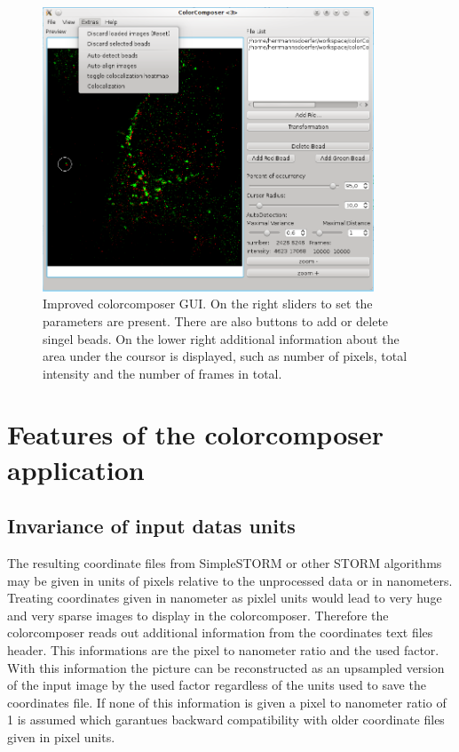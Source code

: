 \begin{figure}
\centering
\includegraphics[width = 0.88\textwidth]{pictures/GuiColorcomposer/BeforeAlignmentWithMenu.png}
\caption{Improved colorcomposer GUI. On the right sliders to set the parameters are present. There are also buttons to add or delete singel beads. On the lower right additional information about the area under the coursor is displayed, such as number of pixels, total intensity and the number of frames in total.}
\label{ColorComposer}
\end{figure}


\section{Features of the colorcomposer application}
\subsection{Invariance of input datas units}
The resulting coordinate files from SimpleSTORM or other STORM algorithms may be given in units of pixels relative to the unprocessed data or in nanometers. Treating coordinates given in nanometer as pixlel units would lead to very huge and very sparse images to display in the colorcomposer. Therefore the colorcomposer reads out additional information from the coordinates text files header. This informations are the pixel to nanometer ratio and the used factor. With this information the picture can be reconstructed as an upsampled version of the input image by the used factor regardless of the units used to save the coordinates file. If none of this information is given a pixel to nanometer ratio of 1 is assumed which garantues backward compatibility with older coordinate files given in pixel units.
